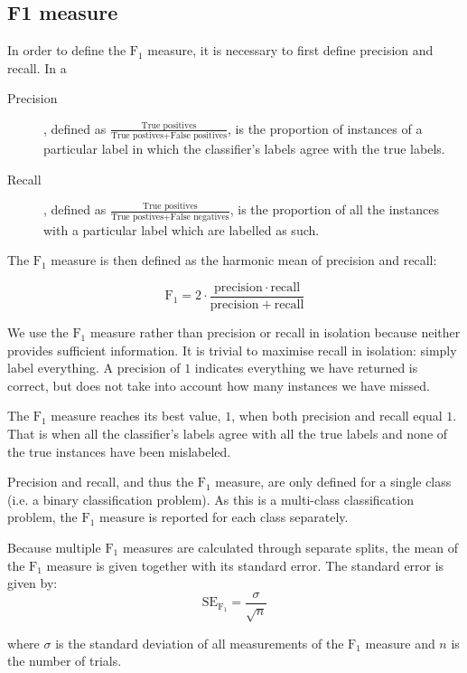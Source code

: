     \subsection{F1 measure}
      In order to define the $\mathrm{F}_1$ measure, it is necessary to first define precision and recall. In a 
      \begin{description}
        \item[Precision], defined as $\frac{\text{True positives}}{\text{True postives} + \text{False positives}}$, is the proportion of instances of a particular label in which the classifier's labels agree with the true labels.
        \item[Recall], defined as $\frac{\text{True positives}}{\text{True postives} + \text{False negatives}}$, is the proportion of all the instances with a particular label which are labelled as such. 
      \end{description}
      
      The $\mathrm{F}_1$ measure is then defined as the harmonic mean of precision and recall:
      
      $$\mathrm{F}_1 = 2 \cdot \frac{\mathrm{precision} \cdot \mathrm{recall}}{\mathrm{precision} + \mathrm{recall}}$$
      
      We use the $\mathrm{F}_1$ measure rather than precision or recall in isolation because neither provides sufficient information. It is trivial to maximise recall in isolation: simply label everything. A precision of $1$ indicates everything we have returned is correct, but does not take into account how many instances we have missed.
    
      The $\mathrm{F}_1$ measure reaches its best value, $1$, when both precision and recall equal $1$. That is when all the classifier's labels agree with all the true labels and none of the true instances have been mislabeled.
      
      Precision and recall, and thus the $\mathrm{F}_1$ measure, are only defined for a single class (i.e. a binary classification problem). As this is a multi-class classification problem, the $\mathrm{F}_1$ measure is reported for each class separately.
      
      Because multiple $\mathrm{F}_1$ measures are calculated through separate splits, the mean of the $\mathrm{F}_1$ measure is given together with its standard error. The standard error is given by:
      $$\mathrm{SE}_{\mathrm{F}_1} = \frac{\sigma}{\sqrt{n}}$$
      
      where $\sigma$ is the standard deviation of all measurements of the $\mathrm{F}_1$ measure and $n$ is the number of trials.
      
